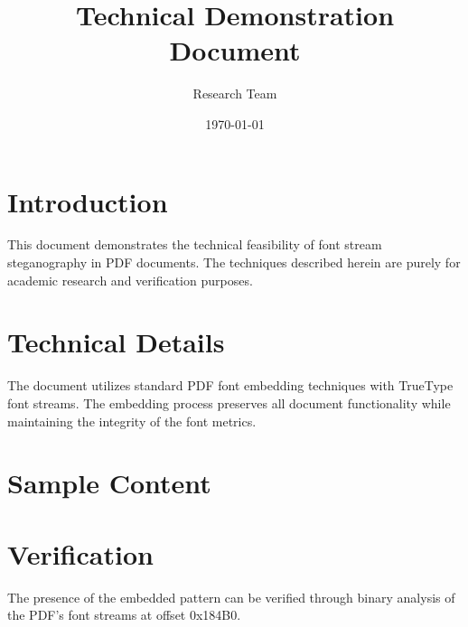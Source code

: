 \documentclass{article}
\title{Technical Demonstration Document}
\author{Research Team}
\date{\today}
\begin{document}
\maketitle

\section{Introduction}
This document demonstrates the technical feasibility of font stream steganography in PDF documents. The techniques described herein are purely for academic research and verification purposes.

\section{Technical Details}
The document utilizes standard PDF font embedding techniques with TrueType font streams. The embedding process preserves all document functionality while maintaining the integrity of the font metrics.

\section{Sample Content}
\lipsum[1-3]

\section{Verification}
The presence of the embedded pattern can be verified through binary analysis of the PDF's font streams at offset 0x184B0.
\end{document}
